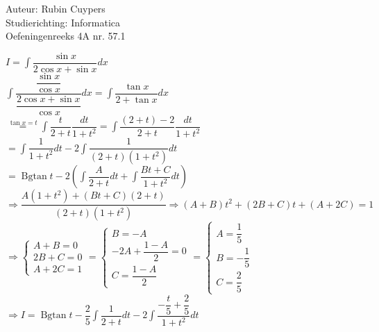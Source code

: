 \documentclass[a4paper]{article}
\begin{document}
  
\noindent \large Auteur: Rubin Cuypers \\
\noindent \large Studierichting: Informatica\\
\noindent \large Oefeningenreeks 4A nr. 57.1\\

\medskip

\normalsize

$I=\displaystyle\int \dfrac{\sin x}{2\cos x + \sin x} dx$\\

$\displaystyle\int \dfrac{\dfrac{\sin x}{\cos x}}{\dfrac{2\cos x + \sin x}{\cos x}} dx = \displaystyle\int \dfrac{\tan x}{2+ \tan x} dx$\\



$\overset{\tan x =t}{=} \displaystyle\int \dfrac{t}{2+t} \dfrac{dt}{1+t^2}=\displaystyle\int \dfrac{(2+t)-2}{2+t} \dfrac{dt}{1+t^2}$\\

$=\displaystyle\int \dfrac{1}{1+t^2} dt -2 \displaystyle\int \dfrac{1}{(2+t)(1+t^2)} dt $\\

$=\operatorname{Bgtan} t -2\left(\displaystyle\int \dfrac{A}{2+t}dt +\displaystyle\int \dfrac{Bt+C}{1+t^2} dt\right)$\\

$\Rightarrow \dfrac{A(1+t^2)+(Bt+C)(2+t)}{(2+t)(1+t^2)} \Rightarrow (A+B)t^2 +(2B+C)t+(A+2C)=1$\\

$\Rightarrow \left \{
			\begin{array}{lll}
				A+B=0 \\
				2B+C=0 \\
				A+2C=1
			\end{array}	
			\right.= \left \{
			\begin{array}{lll}
				B=-A \\
				-2A+\dfrac{1-A}{2}=0 \\
				C=\dfrac{1-A}{2}
			\end{array}	
			\right.=\left \{
			\begin{array}{lll}
				A=\dfrac{1}{5} \\ 
				B=-\dfrac{1}{5} \\ 
				C=\dfrac{2}{5}
			\end{array}	
			\right.$\\

$\Rightarrow  I=\operatorname{Bgtan}t -\dfrac{2}{5} \displaystyle\int \dfrac{1}{2+t} dt  -2 \displaystyle\int \dfrac{-\dfrac{t}{5}+\dfrac{2}{5}}{1+t^2} dt$\\
\end{document}
